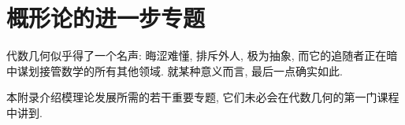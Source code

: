 \chapter{概形论的进一步专题}\label{src:B}
\begin{epigraph}
代数几何似乎得了一个名声: 晦涩难懂, 排斥外人, 极为抽象, 而它的追随者正在暗中谋划接管数学的所有其他领域. 就某种意义而言, 最后一点确实如此.
\end{epigraph}
本附录介绍模理论发展所需的若干重要专题, 它们未必会在代数几何的第一门课程中讲到.
